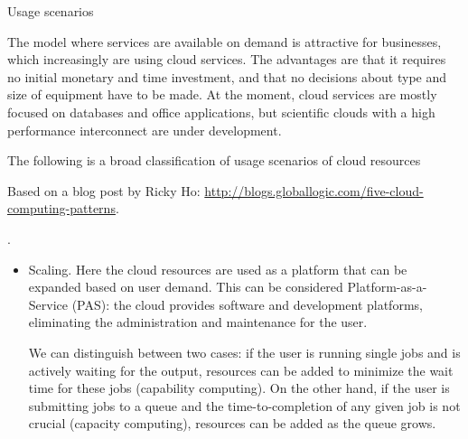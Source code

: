  {Usage scenarios}

The model where services are available on demand is attractive for
businesses, which increasingly are using cloud services. The
advantages are that it requires no initial monetary and time
investment, and that no decisions about type and size of equipment
have to be made. At the moment, cloud services are mostly focused on
databases and office applications, but scientific clouds with a high
performance interconnect are under development.

The following is a broad classification of usage scenarios of cloud
resources
\begin{footnoteenv}
  {Based on a blog post by Ricky Ho:
    \url{http://blogs.globallogic.com/five-cloud-computing-patterns}.}
\end{footnoteenv}
.
\begin{itemize}
\item Scaling. Here the cloud resources are used as a platform that
  can be expanded based on user demand. This can be considered
  Platform-as-a-Service (PAS): the cloud provides software and development platforms,
  eliminating the administration and maintenance for the user. 

  We can distinguish between two cases: if the user is running single
  jobs and is actively waiting for the output, resources can be added
  to minimize the wait time for these jobs (capability computing). On
  the other hand, if the user is submitting jobs to a queue and the
  time-to-completion of any given job is not crucial (capacity
  computing), resources can be added as the queue grows.


\end{itemize}
